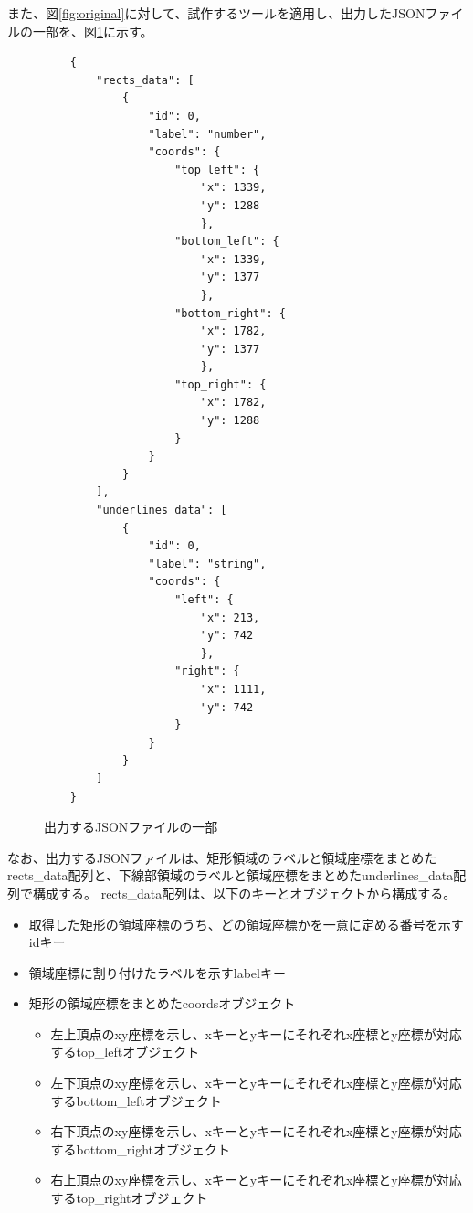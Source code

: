 また、図\ref{fig:original}に対して、試作するツールを適用し、出力したJSONファイルの一部を、図\ref{fig:example_output_json}に示す。
\lstset{language=}
\begin{figure}[tp]
    \begin{lstlisting}
    {
        "rects_data": [
            {
                "id": 0, 
                "label": "number",
                "coords": {
                    "top_left": {
                        "x": 1339,
                        "y": 1288
                        },
                    "bottom_left": {
                        "x": 1339,
                        "y": 1377
                        },
                    "bottom_right": {
                        "x": 1782,
                        "y": 1377
                        },
                    "top_right": {
                        "x": 1782,
                        "y": 1288
                    }
                }
            }
        ],
        "underlines_data": [
            {
                "id": 0,
                "label": "string",
                "coords": {
                    "left": {
                        "x": 213,
                        "y": 742
                        },
                    "right": {
                        "x": 1111,
                        "y": 742
                    }
                }
            }
        ]
    }
    \end{lstlisting}
    \caption{出力するJSONファイルの一部}\label{fig:example_output_json}
\end{figure}

なお、出力するJSONファイルは、矩形領域のラベルと領域座標をまとめたrects\_data配列と、下線部領域のラベルと領域座標をまとめたunderlines\_data配列で構成する。
rects\_data配列は、以下のキーとオブジェクトから構成する。

\begin{itemize}
    \item 取得した矩形の領域座標のうち、どの領域座標かを一意に定める番号を示すidキー
    \item 領域座標に割り付けたラベルを示すlabelキー
    \item 矩形の領域座標をまとめたcoordsオブジェクト
    \begin{itemize}
        \item 左上頂点のxy座標を示し、xキーとyキーにそれぞれx座標とy座標が対応するtop\_leftオブジェクト
        \item 左下頂点のxy座標を示し、xキーとyキーにそれぞれx座標とy座標が対応するbottom\_leftオブジェクト
        \item 右下頂点のxy座標を示し、xキーとyキーにそれぞれx座標とy座標が対応するbottom\_rightオブジェクト
        \item 右上頂点のxy座標を示し、xキーとyキーにそれぞれx座標とy座標が対応するtop\_rightオブジェクト
    \end{itemize}
\end{itemize}

